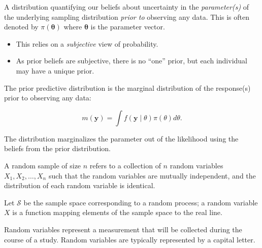\documentclass[
  letterpaper,
  DIV=11,
  numbers=noendperiod]{scrreprt}
\providecommand{\tightlist}{%
  \setlength{\itemsep}{0pt}\setlength{\parskip}{0pt}}\usepackage{longtable,booktabs,array}
\theoremstyle{definition}
\theoremstyle{definition}
\theoremstyle{plain}
\theoremstyle{remark}
\begin{document}
\begin{description}
\tightlist
\item[Prior Distribution (Definition~\ref{def-prior-distribution})]
A distribution quantifying our beliefs about uncertainty in the
\emph{parameter(s)} of the underlying sampling distribution \emph{prior
to} observing any data. This is often denoted by
\(\pi(\boldsymbol{\theta})\) where \(\boldsymbol{\theta}\) is the
parameter vector.
\end{description}

\begin{itemize}
\tightlist
\item
  This relies on a \emph{subjective} view of probability.
\item
  As prior beliefs are subjective, there is no ``one'' prior, but each
  individual may have a unique prior.
\end{itemize}

\begin{description}
\tightlist
\item[Prior Predictive Distribution
(Definition~\ref{def-prior-predictive-distribution})]
The prior predictive distribution is the marginal distribution of the
response(s) prior to observing any data:
\end{description}

\[m(\mathbf{y}) = \int f(\mathbf{y} \mid \theta) \pi(\theta) d\theta.\]

The distribution marginalizes the parameter out of the likelihood using
the beliefs from the prior distribution.

\begin{description}
\tightlist
\item[Random Sample (Definition~\ref{def-random-sample})]
A random sample of size \(n\) refers to a collection of \(n\) random
variables \(X_1, X_2, \dotsc, X_n\) such that the random variables are
mutually independent, and the distribution of each random variable is
identical.
\item[Random Variable (Definition~\ref{def-random-variable})]
Let \(\mathcal{S}\) be the sample space corresponding to a random
process; a random variable \(X\) is a function mapping elements of the
sample space to the real line.
\end{description}

Random variables represent a measurement that will be collected during
the course of a study. Random variables are typically represented by a
capital letter.
\end{document}
